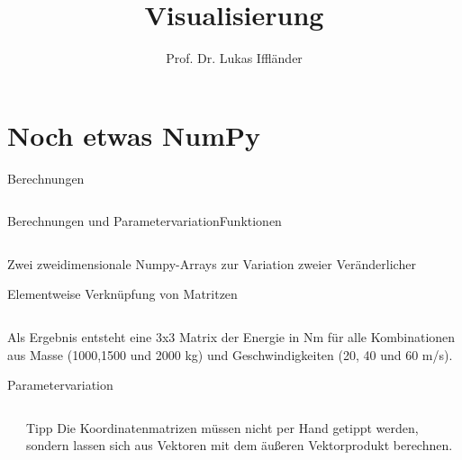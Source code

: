 \documentclass[xelatex,aspectratio=169]{beamer}
\title{Visualisierung}
\author{Prof. Dr. Lukas Iffländer}
\institute{HTW Dresden}
\date{}
\begin{document}
\begin{frame}
    \titlepage
\end{frame}

\section{Noch etwas NumPy}

\begin{frame}{Berechnungen}
    \inputminted{python}{src/numpy_calc_1_dim.py}

\end{frame}

\begin{frame}{Berechnungen und Parametervariation}{Funktionen}
    \inputminted[firstline=5, lastline=17]{python}{src/numpy_calc_1_dim_func.py}

\end{frame}

\begin{frame}{Zwei zweidimensionale Numpy-Arrays zur Variation zweier Veränderlicher}
    \begin{exampleblock}{Elementweise Verknüpfung von Matritzen}
        \inputminted{python}{src/numpy_calc_2_dim.py}
        Als Ergebnis entsteht eine 3x3 Matrix der Energie in Nm für alle Kombinationen aus Masse (1000,1500 und 2000 kg) und Geschwindigkeiten (20, 40 und 60 m/s).

    \end{exampleblock}
\end{frame}

\begin{frame}{Parametervariation}
    \begin{columns}
        \begin{column}{0.6\textwidth}
            \inputminted[firstline=5,lastline=16]{python}{src/numpy_parameter_variation.py}
        \end{column}
        \begin{column}{0.4\textwidth}
            \begin{block}{Tipp}
                Die Koordinatenmatrizen müssen nicht per Hand getippt werden, sondern lassen sich aus Vektoren mit dem äußeren Vektorprodukt berechnen.
            \end{block}
        \end{column}
    \end{columns}

\end{frame}
\end{document}
